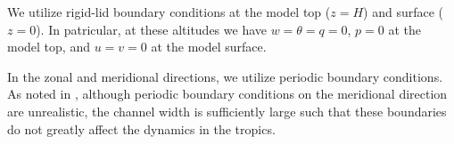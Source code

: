 We utilize rigid-lid boundary conditions at the model top ($z = H$) and surface ($z = 0$). In patricular, at these altitudes we have $w = \theta = q = 0$, $p = 0$ at the model top, and $u = v = 0$ at the model surface.

In the zonal and meridional directions, we utilize periodic boundary conditions. As noted in \cite{Ogrosky19}, although periodic boundary conditions on the meridional direction are unrealistic, the channel width is sufficiently large such that these boundaries do not greatly affect the dynamics in the tropics.

